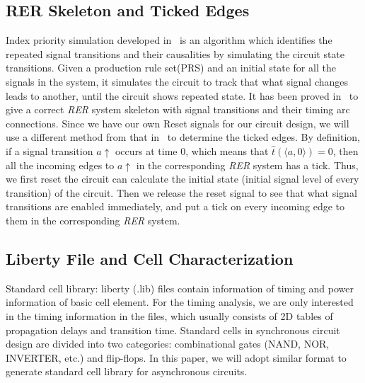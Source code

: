 \documentclass[sigconf, 10pt, twocolumn]{acmart}
\begin{document}
\subsection{RER Skeleton and Ticked Edges}
Index priority simulation developed in~\cite{Lee:Analysis} is an algorithm which identifies the repeated signal transitions and their causalities by simulating the circuit state transitions. Given a production rule set(PRS) and an initial state for all the signals in the system, it simulates the circuit to track that what signal changes leads to another, until the circuit shows repeated state. It has been proved in~\cite{Lee:Analysis} to give a correct {\it RER\/} system skeleton with signal transitions and their timing arc connections. Since we have our own Reset signals for our circuit design, we will use a different method from that in~\cite{Lee:Analysis} to determine the ticked edges. By definition, if a signal transition $a\uparrow$ occurs at time 0, which means that $\hat{t}(\langle a, 0\rangle) = 0$, then all the incoming edges to $a\uparrow$ in the corresponding {\it RER\/} system has a tick. Thus, we first reset the circuit can calculate the initial state (initial signal level of every transition) of the circuit. Then we release the reset signal to see that what signal transitions are enabled immediately, and put a tick on every incoming edge to them in the corresponding {\it RER\/} system.


\subsection{Liberty File and Cell Characterization}
Standard cell library: liberty (.lib) files contain information of timing and power information of basic cell element. For the timing analysis, we are only interested in the timing information in the files, which usually consists of 2D tables of propagation delays and transition time. Standard cells in synchronous circuit design are divided into two categories: combinational gates (NAND, NOR, INVERTER, etc.) and flip-flops. In this paper, we will adopt similar format to generate standard cell library for asynchronous circuits.
\end{document}
